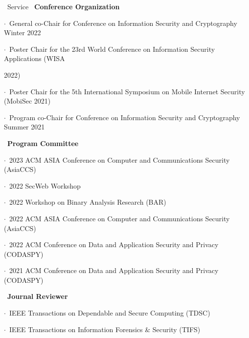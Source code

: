\documentclass{resume} %
\begin{document}
\begin{rSection}{\faGenderless~Service}
    \textbullet~{\bf Conference Organization} \\
		\strut\hspace{1cm}$\cdot$~General co-Chair for Conference on Information Security and Cryptography Winter 2022\\
        \strut\hspace{1cm}$\cdot$~Poster Chair for the 23rd World Conference on Information Security Applications (WISA\\\strut\hspace{1cm}2022)\\
        \strut\hspace{1cm}$\cdot$~Poster Chair for the 5th International Symposium on Mobile Internet Security (MobiSec 2021)\\
        \strut\hspace{1cm}$\cdot$~Program co-Chair for Conference on Information Security and Cryptography Summer 2021

    \textbullet~{\bf Program Committee} \\
		\strut\hspace{1cm}$\cdot$~2023 ACM ASIA Conference on Computer and Communications Security (AsiaCCS)\\
		\strut\hspace{1cm}$\cdot$~2022 SecWeb Workshop\\
		\strut\hspace{1cm}$\cdot$~2022 Workshop on Binary Analysis Research (BAR)\\
    	\strut\hspace{1cm}$\cdot$~2022 ACM ASIA Conference on Computer and Communications Security (AsiaCCS)\\
    	\strut\hspace{1cm}$\cdot$~2022 ACM Conference on Data and Application Security and Privacy (CODASPY)\\
        \strut\hspace{1cm}$\cdot$~2021 ACM Conference on Data and Application Security and Privacy (CODASPY)

    \textbullet~{\bf Journal Reviewer} \\
        \strut\hspace{1cm}$\cdot$~IEEE Transactions on Dependable and Secure Computing (TDSC)\\
        \strut\hspace{1cm}$\cdot$~IEEE Transactions on Information Forensics \& Security (TIFS)


\end{rSection}
\end{document}
